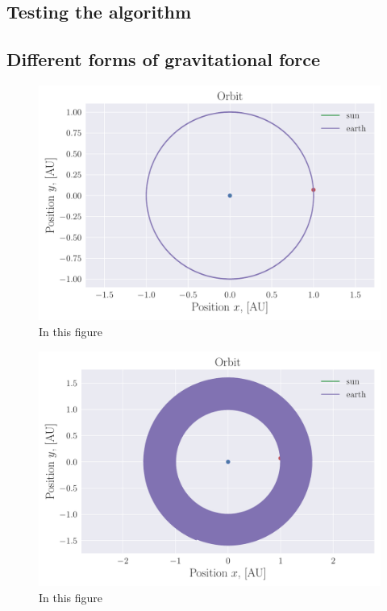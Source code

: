 \documentclass[reprint, english,notitlepage,nofootinbib]{revtex4-1}  %
\begin{document}
\subsection{Testing the algorithm}



\subsection{Different forms of gravitational force}

\begin{figure}[h]
	\centering
	\includegraphics[width=\linewidth]{../output/earth_sun_circ-verlet-3-5-2_75.pdf}
	\caption{In this figure 
		\label{fig:betha=2_75}}
\end{figure}

\begin{figure}[h]
	\centering
	\includegraphics[width=\linewidth]{../output/earth_sun_circ-verlet-3-5-3.pdf}
	\caption{In this figure 
		\label{fig:betha=3}}
\end{figure}
\end{document}
